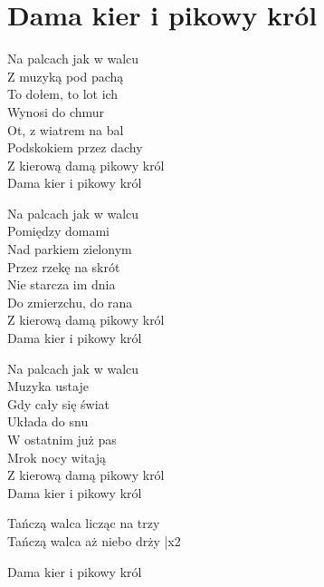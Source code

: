 \section{Dama kier i pikowy król}
\begin{text}
    \hfill\break
Na palcach jak w walcu\\
Z muzyką pod pachą\\
To dołem, to lot ich\\
Wynosi do chmur\\
Ot, z wiatrem na bal\\
Podskokiem przez dachy\\
Z kierową damą pikowy król\\
Dama kier i pikowy król

Na palcach jak w walcu\\
Pomiędzy domami\\
Nad parkiem zielonym\\
Przez rzekę na skrót\\
Nie starcza im dnia\\
Do zmierzchu, do rana\\
Z kierową damą pikowy król\\
Dama kier i pikowy król

Na palcach jak w walcu\\
Muzyka ustaje\\
Gdy cały się świat\\
Układa do snu\\
W ostatnim już pas\\
Mrok nocy witają\\
Z kierową damą pikowy król\\
Dama kier i pikowy król

Tańczą walca licząc na trzy\\
Tańczą walca aż niebo drży |x2

Dama kier i pikowy król
\end{text}
